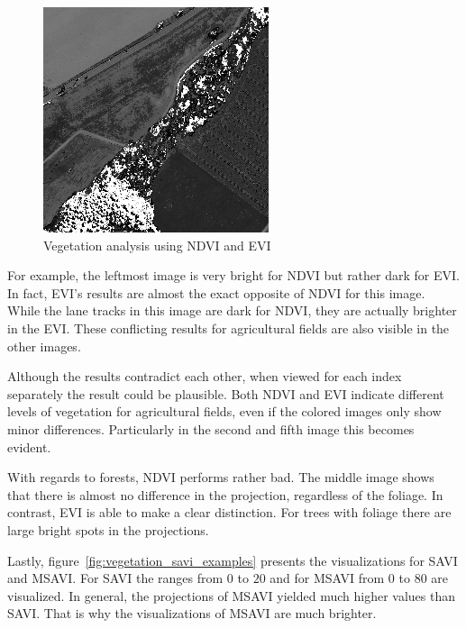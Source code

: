 \begin{figure}
    \includegraphics[width=\VegetationIndicesImageWidth]{images/vegetation/evi/5}

    \caption{Vegetation analysis using NDVI and EVI}
    \label{fig:vegetation_ndvi_examples}
\end{figure}

For example, the leftmost image is very bright for NDVI but rather dark for EVI. In fact, EVI's results are almost the exact opposite of NDVI for this image. While the lane tracks in this image are dark for NDVI, they are actually brighter in the EVI. These conflicting results for agricultural fields are also visible in the other images. 

Although the results contradict each other, when viewed for each index separately the result could be plausible. Both NDVI and EVI indicate different levels of vegetation for agricultural fields, even if the colored images only show minor differences. Particularly in the second and fifth image this becomes evident.

With regards to forests, NDVI performs rather bad. The middle image shows that there is almost no difference in the projection, regardless of the foliage. In contrast, EVI is able to make a clear distinction. For trees with foliage there are large bright spots in the projections.

Lastly, figure~\ref{fig:vegetation_savi_examples} presents the visualizations for SAVI and MSAVI. For SAVI the ranges from $0$ to $20$ and for MSAVI from $0$ to $80$ are visualized. In general, the projections of MSAVI yielded much higher values than SAVI. That is why the visualizations of MSAVI are much brighter. 

